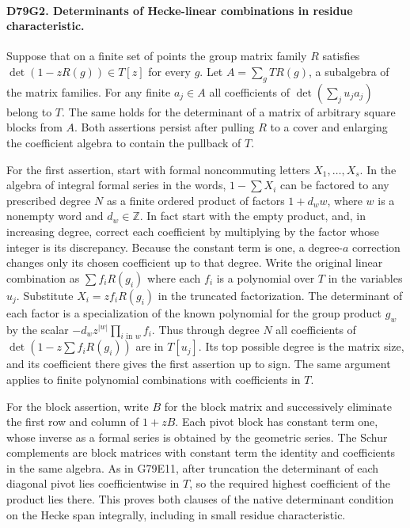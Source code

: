 \paragraph{D79G2. Determinants of Hecke-linear combinations in residue characteristic.}
Suppose that on a finite set of points the group matrix family $R$
satisfies $\det(1-zR(g))\in T[z]$ for every $g$. Let
$A=\sum_g T R(g)$, a subalgebra of the matrix families.
For any finite $a_j\in A$ all coefficients of
$\det(\sum_j u_j a_j)$ belong to $T$. The same holds for
the determinant of a matrix of arbitrary square blocks from $A$.
Both assertions persist after pulling $R$ to a cover and enlarging
the coefficient algebra to contain the pullback of $T$.

For the first assertion, start with formal noncommuting letters
$X_1,\ldots,X_s$. In the algebra of integral formal series in the
words, $1-\sum X_i$ can be factored to any prescribed degree $N$
as a finite ordered product of factors $1+d_w w$, where $w$ is
a nonempty word and $d_w\in\mathbb Z$. In fact start with the
empty product, and, in increasing degree, correct each coefficient
by multiplying by the factor whose integer is its discrepancy.
Because the constant term is one, a degree-$a$ correction changes
only its chosen coefficient up to that degree. Write the original
linear combination as $\sum f_i R(g_i)$ where each $f_i$ is a
polynomial over $T$ in the variables $u_j$. Substitute
$X_i=z f_i R(g_i)$ in the truncated factorization. The determinant
of each factor is a specialization of the known polynomial for
the group product $g_w$ by the scalar
$-d_w z^{|w|}\prod_{i\text{ in }w} f_i$. Thus through degree $N$
all coefficients of $\det(1-z\sum f_i R(g_i))$ are in $T[u_j]$.
Its top possible degree is the matrix size, and its coefficient
there gives the first assertion up to sign. The same argument
applies to finite polynomial combinations with coefficients in $T$.

For the block assertion, write $B$ for the block matrix and
successively eliminate the first row and column of $1+zB$.
Each pivot block has constant term one, whose inverse as a formal
series is obtained by the geometric series. The Schur complements
are block matrices with constant term the identity and coefficients
in the same algebra. As in G79E11, after truncation the determinant
of each diagonal pivot lies coefficientwise in $T$, so the required
highest coefficient of the product lies there. This proves both
clauses of the native determinant condition on the Hecke span
integrally, including in small residue characteristic.

